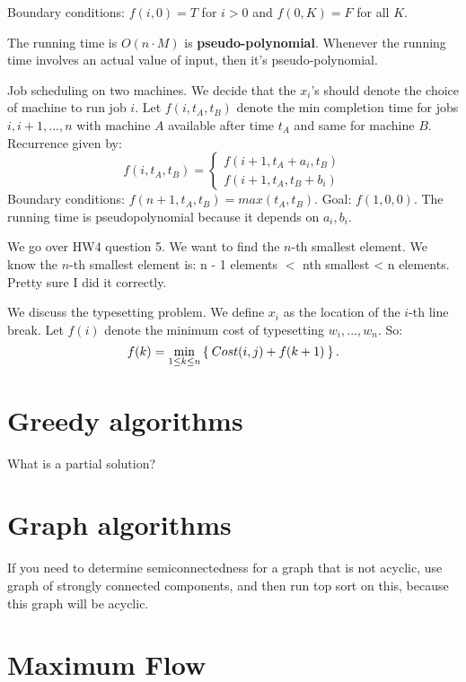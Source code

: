 \documentclass[reqno]{amsbook}
\theoremstyle{plain}
\numberwithin{section}{chapter}
\numberwithin{equation}{chapter}
\theoremstyle{definition}
\theoremstyle{remark}
\newcommand{\bb}{\vspace{3mm}}
\begin{document}
Boundary conditions: $f(i,0) = T$ for $i > 0$ and $f(0,K) = F$ for all $K$. 

The running time is $O(n \cdot M)$ is \textbf{pseudo-polynomial}. Whenever the running time involves an actual value of input, then it's pseudo-polynomial. 



\bb
\bb
\bb

Job scheduling on two machines. We decide that the $x_i$'s should denote the choice of machine to run job $i$. Let $f(i,t_A,t_B)$ denote the min completion time for jobs $i,i + 1,...,n$ with machine $A$ available after time $t_A$ and same for machine $B$. Recurrence given by: 
$$
f(i,t_A,t_B) = \begin{cases}
f(i + 1,t_A + a_i, t_B)\\
f(i + 1,t_A,t_B + b_i)
\end{cases}
$$
Boundary conditions: $f(n + 1,t_A,t_B) = max(t_A,t_B)$. Goal: $f(1,0,0)$. The running time is pseudopolynomial because it depends on $a_i,b_i$. 


\bb
\bb
\bb
\bb
We go over HW4 question 5. We want to find the $n$-th smallest element. We know the $n$-th smallest element is: n - 1 elements $<$ nth smallest < n elements. Pretty sure I did it correctly. 



\bb
\bb\bb\bb\bb\bb\bb
We discuss the typesetting problem. We define $x_i$ as the location of the $i$-th line break. Let $f(i)$ denote the minimum cost of typesetting $w_i,...,w_n$. So:
$$
f(k) = \min_{1 \leq k \leq n} \Set{Cost(i,j) + f(k + 1)}.
$$

\chapter{Greedy algorithms}

What is a partial solution?



\chapter{Graph algorithms}

If you need to determine semiconnectedness for a graph that is not acyclic, use graph of strongly connected components, and then run top sort on this, because this graph will be acyclic. 


\chapter{Maximum Flow}
\end{document}
